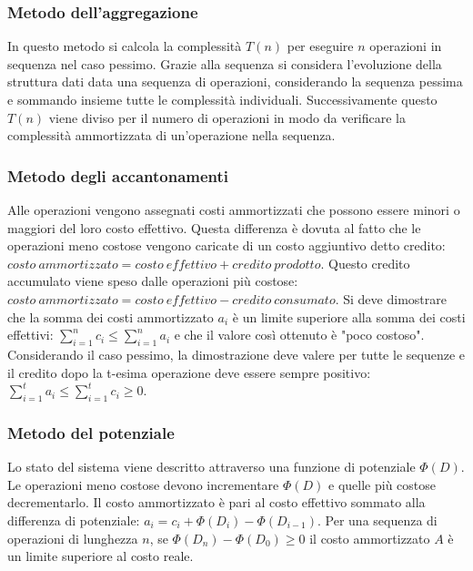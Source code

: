 \subsubsection{Metodo dell'aggregazione}
In questo metodo si calcola la complessit\`a $T(n)$ per eseguire $n$ operazioni in sequenza nel caso pessimo. Grazie alla sequenza si considera l'evoluzione
della struttura dati data una sequenza di operazioni, considerando la sequenza pessima e sommando insieme tutte le complessit\`a individuali. 
Successivamente questo $T(n)$ viene diviso per il numero di operazioni in modo da verificare la complessit\`a ammortizzata di un'operazione nella sequenza.
\subsubsection{Metodo degli accantonamenti}
Alle operazioni vengono assegnati costi ammortizzati che possono essere minori o maggiori del loro costo effettivo. Questa differenza \`e dovuta al fatto
che le operazioni meno costose vengono caricate di un costo aggiuntivo detto credito: $costo\ ammortizzato=costo\ effettivo+credito\ prodotto$. Questo 
credito accumulato viene speso dalle operazioni pi\`u costose: $costo\ ammortizzato=costo\ effettivo-credito\ consumato$. Si deve dimostrare che la somma
dei costi ammortizzato $a_i$ \`e un limite superiore alla somma dei costi effettivi: $\sum\limits_{i=1}^nc_i\le\sum\limits_{i=1}^na_i$ e che il valore 
cos\`i ottenuto \`e "poco costoso". Considerando il caso pessimo, la dimostrazione deve valere per tutte le sequenze e il credito dopo la t-esima operazione
deve essere sempre positivo: $\sum\limits_{i=1}^ta_i\le\sum\limits_{i=1}^tc_i\ge 0$.
\subsubsection{Metodo del potenziale}
Lo stato del sistema viene descritto attraverso una funzione di potenziale $\Phi(D)$. Le operazioni meno costose devono incrementare $\Phi(D)$ e quelle
pi\`u costose decrementarlo. Il costo ammortizzato \`e pari al costo effettivo sommato alla differenza di potenziale: $a_i=c_i+\Phi(D_i)-\Phi(D_{i-1})$.
Per una sequenza di operazioni di lunghezza $n$, se $\Phi(D_n)-\Phi(D_0)\ge 0$ il costo ammortizzato $A$ \`e un limite superiore al costo reale.
